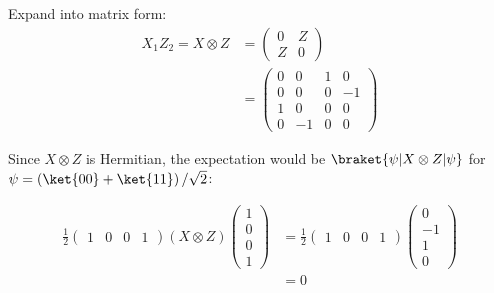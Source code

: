 \par Expand into matrix form:
\begin{align}
X_1 Z_2 = X \otimes Z &= \begin{pmatrix} 0 & Z \\ Z & 0 \end{pmatrix} \\
&= \begin{pmatrix} 0 & 0 & 1 & 0 \\ 0 & 0 & 0 & -1 \\ 1 & 0 & 0 & 0 \\ 0 & -1 &
0 & 0 \end{pmatrix}
\end{align}

Since $X \otimes Z$ is Hermitian, the expectation would be $\braket{\psi| X
\otimes Z | \psi}$ for $\psi = \left( \ket{00} + \ket{11} \right) / \sqrt{2}$:

\begin{align}
\frac{1}{2} \begin{pmatrix} 1 & 0 & 0 & 1 \end{pmatrix} \left( X \otimes Z
\right) \begin{pmatrix} 1 \\ 0 \\ 0 \\ 1 \end{pmatrix} &= \frac{1}{2}
\begin{pmatrix} 1 & 0 & 0 & 1 \end{pmatrix} \begin{pmatrix} 0 \\ -1 \\ 1 \\ 0
\end{pmatrix} \\
&= 0
\end{align}
